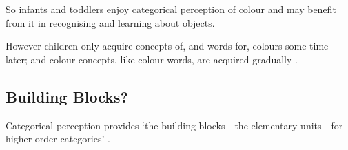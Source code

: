 \documentclass[12pt]{extarticle}
\begin{document}
\begin{multicols}{3}
So infants and toddlers enjoy categorical perception of colour and may benefit from it in recognising and learning about objects.
 
However children only acquire concepts of, and words for, colours some time later; and colour concepts, like colour words, are acquired gradually \citep{Pitchford:2005hm,Kowalski:2006hk,Sandhofer:1999if,Sandhofer:2006qo}.
 
\subsection{Building Blocks?}
 
Categorical perception provides ‘the building blocks—the elementary units—for higher-order categories’
\citep[p.\ 3]{Harnad:1987ej}.
 


 

 
\footnotesize 


\end{multicols}
\end{document}
